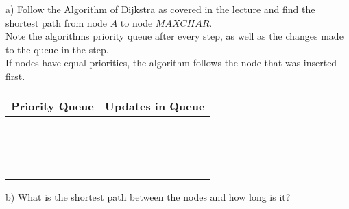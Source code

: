 a) Follow the \href{https://sebastianoner.github.io/TUMGAD/src/Algorithms/Graphs/ShortestPaths/Dijkstra}{\underline{Algorithm of Dijkstra}} as covered in the lecture and find the shortest path from node $A$ to node $MAXCHAR$.\\
Note the algorithms priority queue after every step, as well as the changes made to the queue in the step.\\
If nodes have equal priorities, the algorithm follows the node that was inserted first.\\
\newpage
\begin{center}
    \begin{tabular}{|P{8cm}|P{6cm}|}
        \hline
        Priority Queue & Updates in Queue\\
        \hline
        \hline
        &\\[1.5ex]
        \hline
        &\\[1.5ex]
        \hline
        &\\[1.5ex]
        \hline
        &\\[1.5ex]
        \hline
        &\\[1.5ex]
        \hline
        &\\[1.5ex]
        \hline
        &\\[1.5ex]
        \hline
        &\\[1.5ex]
        \hline
        &\\[1.5ex]
        \hline
        &\\[1.5ex]
        \hline
        &\\[1.5ex]
        \hline
        &\\[1.5ex]
        \hline
        &\\[1.5ex]
        \hline
        &\\[1.5ex]
        \hline
        &\\[1.5ex]
        \hline
    \end{tabular}
\end{center}
b) What is the shortest path between the nodes and how long is it?\\
\begin{center}
    \noindent{}
\end{center}
